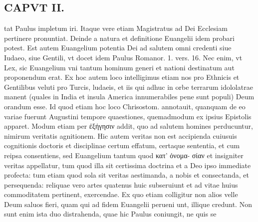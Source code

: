 \documentclass{article}
\begin{document}
\begin{pages}
\section*{CAPVT  II. }
\marginpar{[ p.53 ]}\pstart tat Paulus impletum iri. Itaque vere etiam Magistratus ad Dei Ecclesiam pertinere pronuntiat. Deinde a natura et definitione Euangelii idem probari potest. Est autem Euangelium potentia Dei ad salutem omni credenti siue Iudaeo, siue Gentili, vt docet idem Paulus Romanor. 1. vers. 16. Nec enim, vt Lex, sic Euangelium vni tantum hominum generi et nationi destinatum aut proponendum erat. Ex hoc autem loco intelligimus etiam nos pro Ethnicis et Gentilibus veluti pro Turcis, ludaeis, et iis qui adhuc in orbe terrarum idololatrae manent (quales in India et insula America innumerabiles pene sunt populi) Deum orandum esse. Id quod etiam hoc loco Chrisostom. annotauit, quanquam de eo variae fuerunt Augustini tempore quaestiones, quemadmodum ex ipsius Epistolis apparet. Modum etiam per ἐξήγησιν addit, quo ad salutem homines perducuntur, nimirum veritatis agnitionem. Hic autem veritas non est accipienda cuiusuis cognitionis doctoris et disciplinae certum effatum, certaque sententia, et cum reipsa consentiens, sed Euangelium tantum quod κατ' ὀνομα- σίαν et insigniter veritas appellatur, tum quod illa sit certissima doctrina et a Deo ipso immediate profecta: tum etiam quod sola sit veritas aestimanda, a nobis et consectanda, et persequenda: reliquae vero artes quatenus huic subseruiunt et ad vitae huius commoditatem pertinent, exercendae. Ex quo etiam colligitur non alios velle Deum saluos fieri, quam qui ad fidem Euangelii perueni unt, illique credunt. Non sunt enim ista duo distrahenda, quae hic Paulus coniungit, ne quis se  \pend

\end{pages}
\end{document}
